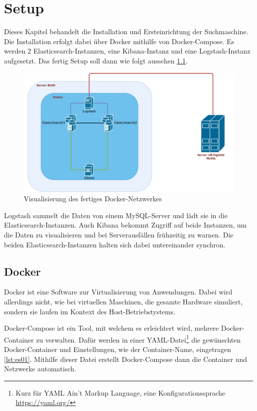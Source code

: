 \chapter{Setup}

Dieses Kapitel behandelt die Installation und Ersteinrichtung der Suchmaschine. Die Installation erfolgt dabei über Docker mithilfe von Docker-Compose. Es werden 2 Elasticsearch-Instanzen, eine Kibana-Instanz und eine Logstash-Instanz aufgesetzt. Das fertig Setup soll dann wie folgt aussehen \ref{img:dockerNetwork}.

\begin{figure}
	\centering
	\includegraphics[width=1\linewidth]{images/docker_structure.png}
	\caption{Visualisierung des fertiges Docker-Netzwerkes}
	\label{img:dockerNetwork}
\end{figure}

Logstash sammelt die Daten von einem MySQL-Server und lädt sie in die Elasticsearch-Instanzen. Auch Kibana bekommt Zugriff auf beide Instanzen, um die Daten zu visualisieren und bei Serverausfällen frühzeitig zu warnen. Die beiden Elasticsearch-Instanzen halten sich dabei untereinander synchron. 

\section{Docker}

Docker ist eine Software zur Virtualisierung von Anwendungen. Dabei wird allerdings nicht, wie bei virtuellen Maschinen, die gesamte Hardware simuliert, sondern sie laufen im Kontext des Host-Betriebstystems.

Docker-Compose ist ein Tool, mit welchem es erleichtert wird, mehrere Docker-Container zu verwalten. Dafür werden in einer YAML-Datei\footnote{Kurz für YAML Ain't Markup Language, eine Konfigurationssprache \url{https://yaml.org/}} die gewünschten Docker-Container und Einstellungen, wie der Container-Name, eingetragen \ref{lst:es01}. Mithilfe dieser Datei erstellt Docker-Compose dann die Container und Netzwerke automatisch.

